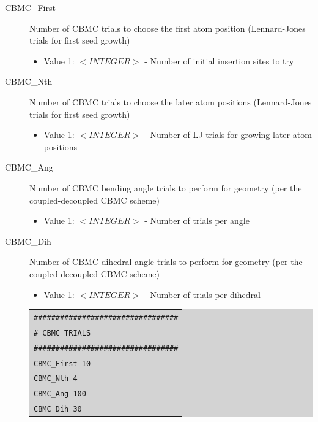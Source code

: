 \begin{description}
\item [CBMC\_First] Number of CBMC trials to choose the first atom position (Lennard-Jones trials for first seed growth)
	\begin{itemize}
	\item Value 1: $<INTEGER>$ - Number of initial insertion sites to try
	\end{itemize}
\item [CBMC\_Nth] Number of CBMC trials to choose the later atom positions (Lennard-Jones trials for first seed growth)
	\begin{itemize}
	\item Value 1: $<INTEGER>$ - Number of LJ trials for growing later atom positions
	\end{itemize}
\item [CBMC\_Ang] Number of CBMC bending angle trials to perform for geometry (per the coupled-decoupled CBMC scheme)
	\begin{itemize}
	\item Value 1: $<INTEGER>$ - Number of trials per angle 
	\end{itemize}
\item [CBMC\_Dih] Number of CBMC dihedral angle trials to perform for geometry (per the coupled-decoupled CBMC scheme)
	\begin{itemize}
	\item Value 1: $<INTEGER>$ - Number of trials per dihedral
	\end{itemize}
	\colorbox{lightgray}{
	\begin{tabular}{l}
	\texttt{\#\#\#\#\#\#\#\#\#\#\#\#\#\#\#\#\#\#\#\#\#\#\#\#\#\#\#\#\#\#\#\#\#}\\
	\texttt{\#  CBMC TRIALS}\\
	\texttt{\#\#\#\#\#\#\#\#\#\#\#\#\#\#\#\#\#\#\#\#\#\#\#\#\#\#\#\#\#\#\#\#\#}\\
	\texttt{CBMC\_First   10}\\
	\texttt{CBMC\_Nth     4}\\
	\texttt{CBMC\_Ang     100}\\
	\texttt{CBMC\_Dih     30}\\
	\end{tabular}}
\end{description}
